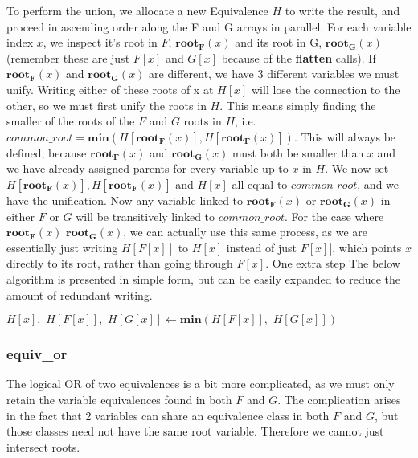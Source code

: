 \documentclass[11pt,table]{article}
\newcounter{r}
\newcommand{\func}[2]{\mathbf{#1}(#2)}
\newcommand{\gap}{\hspace{4pt}}
\begin{document}
To perform the union, we allocate a new Equivalence $ H $ to write the result, and proceed in ascending order along the F and G arrays in parallel. For each variable index $ x $, we inspect it's root in $ F $, $ \func{root_F}{x} $ and its root in G, $ \func{root_G}{x} $ (remember these are just $ F[x] $ and $ G[x] $ because of the \textbf{flatten} calls). If $ \func{root_F}{x} $ and $ \func{root_G}{x} $ are different, we have 3 different variables we must unify. Writing either of these roots of x at $ H[x] $ will lose the connection to the other, so we must first unify the roots in $ H $. This means simply finding the smaller of the roots of the $ F $ and $ G $ roots in $ H $, i.e. $ common\_root = \func{min}{H[\func{root_F}{x}], H[\func{root_F}{x}]} $. This will always be defined, because $ \func{root_F}{x} $ and $ \func{root_G}{x} $ must both be smaller than $ x $ and we have already assigned parents for every variable up to $ x $ in $ H $. We now set $ H[\func{root_F}{x}], H[\func{root_F}{x}] $ and $ H[x] $ all equal to $ common\_root $, and we have the unification. Now any variable linked to $ \func{root_F}{x} $ or $ \func{root_G}{x} $ in either $ F $ or $ G $ will be transitively linked to $ common\_root $. For the case where $ \func{root_F}{x} $ $ \func{root_G}{x} $, we can actually use this same process, as we are essentially just writing $ H[F[x]] $ to $ H[x] $ instead of just $ F[x]] $, which points $ x $ directly to its root, rather than going through $ F[x] $. 
One extra step 
The below algorithm is presented in simple form, but can be easily expanded to reduce the amount of redundant writing.

\begin{algorithm}
	\begin{algorithmic}[1]
		\State {} 
		\State $ H[x], \gap H[F[x]], \gap H[G[x]] \gets \func{min}{H[F[x]], \gap H[G[x]]}$
		\EndFor
		
		\EndFunction
	\end{algorithmic}
\end{algorithm}

\subsubsection{equiv\_or}

The logical OR of two equivalences is a bit more complicated, as we must only retain the variable equivalences found in both $ F $ and $ G $. The complication arises in the fact that 2 variables can share an equivalence class in both $ F $ and $ G $, but those classes need not have the same root variable. Therefore we cannot just intersect roots.
\end{document}
